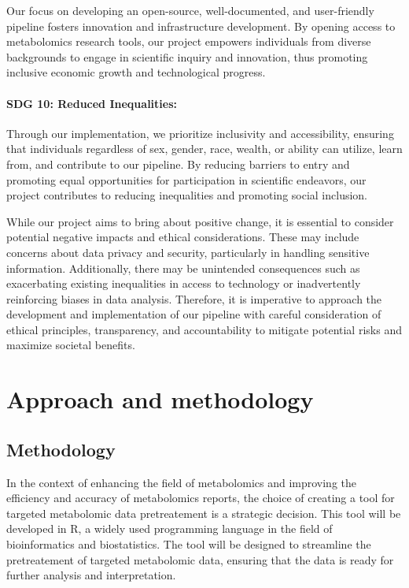 \documentclass[ENG, BIB]{TFUOC}%
\begin{document}
Our focus on developing an open-source, well-documented, and user-friendly pipeline fosters innovation and infrastructure development. By opening access to metabolomics research tools, our project empowers individuals from diverse backgrounds to engage in scientific inquiry and innovation, thus promoting inclusive economic growth and technological progress.

\subsubsection{SDG 10: Reduced Inequalities:}

Through our implementation, we prioritize inclusivity and accessibility, ensuring that individuals regardless of sex, gender, race, wealth, or ability can utilize, learn from, and contribute to our pipeline. By reducing barriers to entry and promoting equal opportunities for participation in scientific endeavors, our project contributes to reducing inequalities and promoting social inclusion.

\vspace{18pt}

While our project aims to bring about positive change, it is essential to consider potential negative impacts and ethical considerations. These may include concerns about data privacy and security, particularly in handling sensitive information. Additionally, there may be unintended consequences such as exacerbating existing inequalities in access to technology or inadvertently reinforcing biases in data analysis. Therefore, it is imperative to approach the development and implementation of our pipeline with careful consideration of ethical principles, transparency, and accountability to mitigate potential risks and maximize societal benefits.

\chapter{Approach and methodology}
\section{Methodology}

In the context of enhancing the field of metabolomics and improving the efficiency and accuracy of metabolomics reports, the choice of creating a tool for targeted metabolomic data pretreatement is a strategic decision. This tool will be developed in R, a widely used programming language in the field of bioinformatics and biostatistics. The tool will be designed to streamline the pretreatement of targeted metabolomic data, ensuring that the data is ready for further analysis and interpretation.
\end{document}
